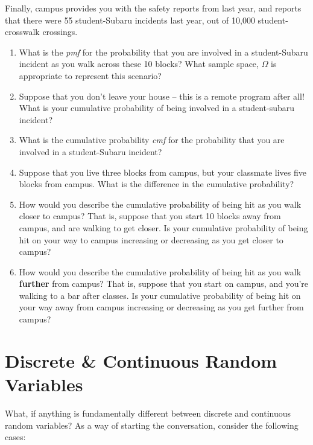 \documentclass[
  letterpaper,
  DIV=11,
  numbers=noendperiod]{scrreprt}
\providecommand{\tightlist}{%
  \setlength{\itemsep}{0pt}\setlength{\parskip}{0pt}}\usepackage{longtable,booktabs,array}
\begin{document}
Finally, campus provides you with the safety reports from last year, and
reports that there were 55 student-Subaru incidents last year, out of
10,000 student-crosswalk crossings.

\begin{enumerate}
\def\labelenumi{\arabic{enumi}.}
\tightlist
\item
  What is the \emph{pmf} for the probability that you are involved in a
  student-Subaru incident as you walk across these 10 blocks? What
  sample space, \(\Omega\) is appropriate to represent this scenario?
\item
  Suppose that you don't leave your house -- this is a remote program
  after all! What is your cumulative probability of being involved in a
  student-subaru incident?
\item
  What is the cumulative probability \emph{cmf} for the probability that
  you are involved in a student-Subaru incident?
\item
  Suppose that you live three blocks from campus, but your classmate
  lives five blocks from campus. What is the difference in the
  cumulative probability?
\item
  How would you describe the cumulative probability of being hit as you
  walk closer to campus? That is, suppose that you start 10 blocks away
  from campus, and are walking to get closer. Is your cumulative
  probability of being hit on your way to campus increasing or
  decreasing as you get closer to campus?
\item
  How would you describe the cumulative probability of being hit as you
  walk \textbf{further} from campus? That is, suppose that you start on
  campus, and you're walking to a bar after classes. Is your cumulative
  probability of being hit on your way away from campus increasing or
  decreasing as you get further from campus?
\end{enumerate}

\section{Discrete \& Continuous Random
Variables}\label{discrete-continuous-random-variables}

What, if anything is fundamentally different between discrete and
continuous random variables? As a way of starting the conversation,
consider the following cases:
\end{document}
